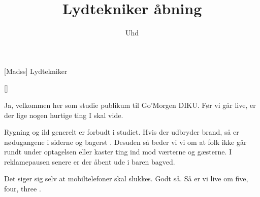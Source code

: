 \documentclass[a4paper,11pt]{article}
\title{Lydtekniker åbning}
\author{Uhd}
\begin{document}
\maketitle

\begin{roles}
[Madss] Lydtekniker
\end{roles}

\begin{props}
[]
\end{props}

  
\begin{sketch}


 Ja, velkommen her som studie publikum til Go'Morgen DIKU. Før vi går
live, er der lige nogen hurtige ting I skal vide. 

 Rygning og ild generelt er forbudt i studiet. Hvis der udbryder brand,
så er nødugangene i siderne og bagerst . Desuden så
beder vi vi om at folk ikke går rundt under optagelsen eller kaster ting ind mod
værterne og gæsterne. I reklamepausen senere er der åbent ude i baren bagved. 

 Det siger sig selv at mobiltelefoner skal slukkes. Godt så. Så er vi
live om  five, four, three . 


\end{sketch}
\end{document}
